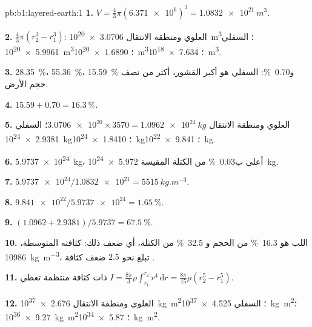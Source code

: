 \begin{solution}{pb:b1:layered-earth:1}
\textbf{1.} $V = \tfrac43\pi(\num{6.371e6})^3 = \qty{1.0832e21}{m^3}$.

\textbf{2.} $\tfrac43\pi(r_2^3 - r_1^3)$:   العلوي ومنطقة الانتقال
\qty{3.0706e20}{m^3}؛  السفلي \qty{5.9961e20}{m^3}؛ 
\qty{1.6890e20}{m^3}؛  \qty{7.634e18}{m^3}.

\textbf{3.} \qty{28.35}{\percent}، \qty{55.36}{\percent}، \qty{15.59}{\percent}
و\qty{0.70}{\percent}:  السفلي هو أكبر القشور، أكثر من نصف
حجم الأرض.

\textbf{4.} $15.59 + 0.70 = \qty{16.3}{\percent}$.

\textbf{5.}   العلوي ومنطقة الانتقال $\num{3.0706e20}\times3570 =
\qty{1.0962e24}{kg}$؛  السفلي \qty{2.9381e24}{kg}؛ 
\qty{1.8410e24}{kg}؛  \qty{9.841e22}{kg}.

\textbf{6.} \qty{5.9737e24}{kg}، أعلى ب\qty{0.03}{\percent} من الكتلة المقيسة
\qty{5.972e24}{kg}.

\textbf{7.} $\num{5.9737e24}/\num{1.0832e21} = \qty{5515}{kg.m^{-3}}$.

\textbf{8.} $\num{9.841e22}/\num{5.9737e24} = \qty{1.65}{\percent}$.

\textbf{9.} $(1.0962 + 2.9381)/5.9737 = \qty{67.5}{\percent}$.

\textbf{10.} اللب هو \qty{16.3}{\percent} من الحجم و
\qty{32.5}{\percent} من الكتلة، أي ضعف ذلك: كثافته المتوسطة،
\qty{10986}{kg.m^{-3}}، تبلغ نحو $2.5$ ضعف كثافة .

\textbf{11.}  ذات كثافة منتظمة تعطي
$I = \tfrac{8\pi}{3}\rho\int_{r_1}^{r_2} r^4\,\mathrm dr = \tfrac{8\pi}{15}\rho
(r_2^5 - r_1^5)$.

\textbf{12.}   العلوي ومنطقة الانتقال \qty{2.676e37}{kg.m^2}؛  السفلي
\qty{4.525e37}{kg.m^2}؛  \qty{9.27e36}{kg.m^2}؛ 
\qty{5.87e34}{kg.m^2}.


\end{solution}
